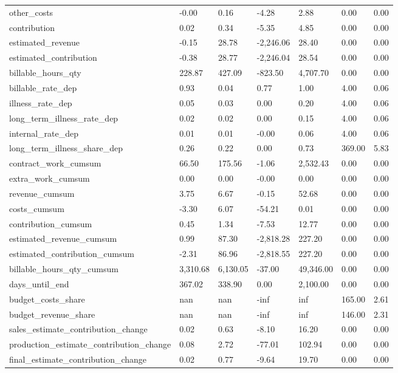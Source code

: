 \begin{landscape}
\begin{longtable}[h!]{lllllll}
other_costs & -0.00 & 0.16 & -4.28 & 2.88 & 0.00 & 0.00 \\
contribution & 0.02 & 0.34 & -5.35 & 4.85 & 0.00 & 0.00 \\
estimated_revenue & -0.15 & 28.78 & -2,246.06 & 28.40 & 0.00 & 0.00 \\
estimated_contribution & -0.38 & 28.77 & -2,246.04 & 28.54 & 0.00 & 0.00 \\
billable_hours_qty & 228.87 & 427.09 & -823.50 & 4,707.70 & 0.00 & 0.00 \\
billable_rate_dep & 0.93 & 0.04 & 0.77 & 1.00 & 4.00 & 0.06 \\
illness_rate_dep & 0.05 & 0.03 & 0.00 & 0.20 & 4.00 & 0.06 \\
long_term_illness_rate_dep & 0.02 & 0.02 & 0.00 & 0.15 & 4.00 & 0.06 \\
internal_rate_dep & 0.01 & 0.01 & -0.00 & 0.06 & 4.00 & 0.06 \\
long_term_illness_share_dep & 0.26 & 0.22 & 0.00 & 0.73 & 369.00 & 5.83 \\
contract_work_cumsum & 66.50 & 175.56 & -1.06 & 2,532.43 & 0.00 & 0.00 \\
extra_work_cumsum & 0.00 & 0.00 & -0.00 & 0.00 & 0.00 & 0.00 \\
revenue_cumsum & 3.75 & 6.67 & -0.15 & 52.68 & 0.00 & 0.00 \\
costs_cumsum & -3.30 & 6.07 & -54.21 & 0.01 & 0.00 & 0.00 \\
contribution_cumsum & 0.45 & 1.34 & -7.53 & 12.77 & 0.00 & 0.00 \\
estimated_revenue_cumsum & 0.99 & 87.30 & -2,818.28 & 227.20 & 0.00 & 0.00 \\
estimated_contribution_cumsum & -2.31 & 86.96 & -2,818.55 & 227.20 & 0.00 & 0.00 \\
billable_hours_qty_cumsum & 3,310.68 & 6,130.05 & -37.00 & 49,346.00 & 0.00 & 0.00 \\
days_until_end & 367.02 & 338.90 & 0.00 & 2,100.00 & 0.00 & 0.00 \\
budget_costs_share & nan & nan & -inf & inf & 165.00 & 2.61 \\
budget_revenue_share & nan & nan & -inf & inf & 146.00 & 2.31 \\
sales_estimate_contribution_change & 0.02 & 0.63 & -8.10 & 16.20 & 0.00 & 0.00 \\
production_estimate_contribution_change & 0.08 & 2.72 & -77.01 & 102.94 & 0.00 & 0.00 \\
final_estimate_contribution_change & 0.02 & 0.77 & -9.64 & 19.70 & 0.00 & 0.00 \\

\end{longtable}
\end{landscape}
